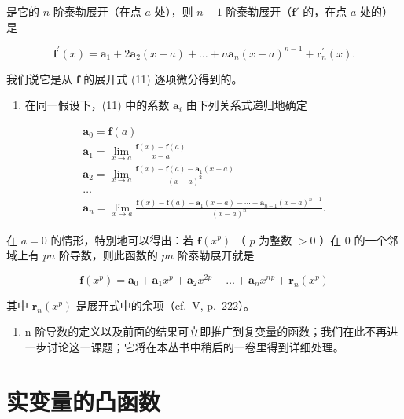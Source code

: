 是它的 \(n\) 阶泰勒展开（在点 \(a\) 处），则 \(n - 1\) 阶泰勒展开（\(\mathbf{f}'\) 的，在点 \(a\) 处的）是

\[
\mathbf {f} ^ {\prime} (x) = \mathbf {a} _ {1} + 2 \mathbf {a} _ {2} (x - a) + \dots + n \mathbf {a} _ {n} (x - a) ^ {n - 1} + \mathbf {r} _ {n} ^ {\prime} (x).\tag{12}
\]

我们说它是从 \(\mathbf{f}\) 的展开式 (11) 逐项微分得到的。

\begin{enumerate}
\def\labelenumi{\arabic{enumi})}
\setcounter{enumi}{1}
\tightlist
\item
  在同一假设下，(11) 中的系数 \(\mathbf{a}_i\) 由下列关系式递归地确定
\end{enumerate}

\[
\begin{array}{l} \mathbf {a} _ {0} = \mathbf {f} (a) \\ \mathbf {a} _ {1} = \lim _ {x \to a} \frac {\mathbf {f} (x) - \mathbf {f} (a)}{x - a} \\ \mathbf {a} _ {2} = \lim _ {x \to a} \frac {\mathbf {f} (x) - \mathbf {f} (a) - \mathbf {a} _ {1} (x - a)}{(x - a) ^ {2}} \\ \dots \\ \mathbf {a} _ {n} = \lim _ {x \to a} \frac {\mathbf {f} (x) - \mathbf {f} (a) - \mathbf {a} _ {1} (x - a) - \cdots - \mathbf {a} _ {n - 1} (x - a) ^ {n - 1}}{(x - a) ^ {n}}. \end{array}
\]

在 \(a = 0\) 的情形，特别地可以得出：若 \(\mathbf{f}(x^p)\) （ \(p\) 为整数 \(> 0\) ）在 0 的一个邻域上有 \(pn\) 阶导数，则此函数的 \(pn\) 阶泰勒展开就是

\[
\mathbf {f} (x ^ {p}) = \mathbf {a} _ {0} + \mathbf {a} _ {1} x ^ {p} + \mathbf {a} _ {2} x ^ {2 p} + \dots + \mathbf {a} _ {n} x ^ {n p} + \mathbf {r} _ {n} (x ^ {p})\tag{13}
\]

其中 \(\mathbf{r}_{n}(x^{p})\) 是展开式中的余项（cf.~V, p.~222）。

\begin{enumerate}
\def\labelenumi{\arabic{enumi})}
\setcounter{enumi}{2}
\tightlist
\item
  n 阶导数的定义以及前面的结果可立即推广到复变量的函数；我们在此不再进一步讨论这一课题；它将在本丛书中稍后的一卷里得到详细处理。
\end{enumerate}

\section{实变量的凸函数}

